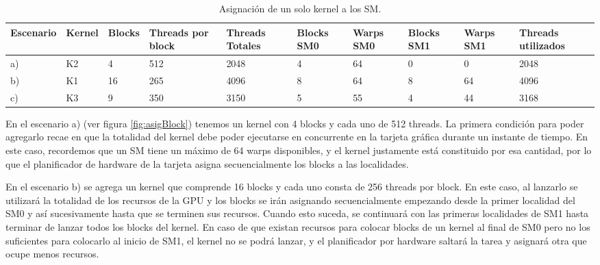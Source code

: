   \begin{table}[h!]
      \begin{center}
            \scriptsize
        \begin{tabular}{|m{1.5cm}|m{1cm}|m{1cm}|m{1.5cm}|m{1.5cm}|m{1cm}|m{1cm}|m{1cm}|m{1cm}|m{1.5cm}|}
         \hline
         \cellcolor{lightgray}\textbf{Escenario} &
         \cellcolor{lightgray}\textbf{Kernel} & 
         \cellcolor{lightgray}\textbf{Blocks} &
         \cellcolor{lightgray}\textbf{Threads por block} &
         \cellcolor{lightgray}\textbf{Threads Totales} &
         \cellcolor{lightgray}\textbf{Blocks SM0} &
         \cellcolor{lightgray}\textbf{Warps SM0} &
         \cellcolor{lightgray}\textbf{Blocks SM1} &
         \cellcolor{lightgray}\textbf{Warps SM1} &
         \cellcolor{lightgray}\textbf{Threads utilizados}\\ 
         \hline
         a) & K2 & 4 & 512 & 2048 & 4 & 64 & 0 & 0 & 2048\\ 
         \hline
         b) & K1 & 16 & 265 & 4096 & 8 & 64 & 8 & 64 & 4096\\ 
         \hline
         c) & K3 & 9 & 350 & 3150 & 5 & 55 & 4 & 44 & 3168\\ 
         \hline
           \end{tabular}
        \caption{Asignación de un solo kernel a los SM.}
        \label{tab:asigUnKernelSM}
      \end{center}
    \end{table}
    
    En el escenario a) (ver figura \ref{fig:asigBlock}) tenemos un kernel con 4 blocks y cada uno de 512 threads. La primera condición para poder agregarlo recae en que la totalidad del kernel debe poder ejecutarse en concurrente en la tarjeta gráfica durante un  instante de tiempo. En este caso, recordemos que un SM tiene un máximo de 64 warps disponibles, y el kernel justamente está constituido por esa cantidad, por lo que el planificador de hardware de la tarjeta asigna secuencialmente los blocks a las localidades.
    \newline
    
    En el escenario b) se agrega un kernel que comprende 16 blocks y cada uno consta de 256 threads por block. En este caso, al lanzarlo se utilizará la totalidad de los recursos de la GPU y los blocks se irán asignando secuencialmente empezando desde la primer localidad del SM0 y así sucesivamente hasta que se terminen sus recursos. Cuando esto suceda, se continuará con las primeras localidades de SM1 hasta terminar de lanzar todos los blocks del kernel. En caso de que existan recursos para colocar blocks de un kernel al final de SM0 pero no los suficientes para colocarlo al inicio de SM1, el kernel no se podrá lanzar, y el planificador por hardware saltará la tarea y asignará otra que ocupe menos recursos.
    \newline
    
